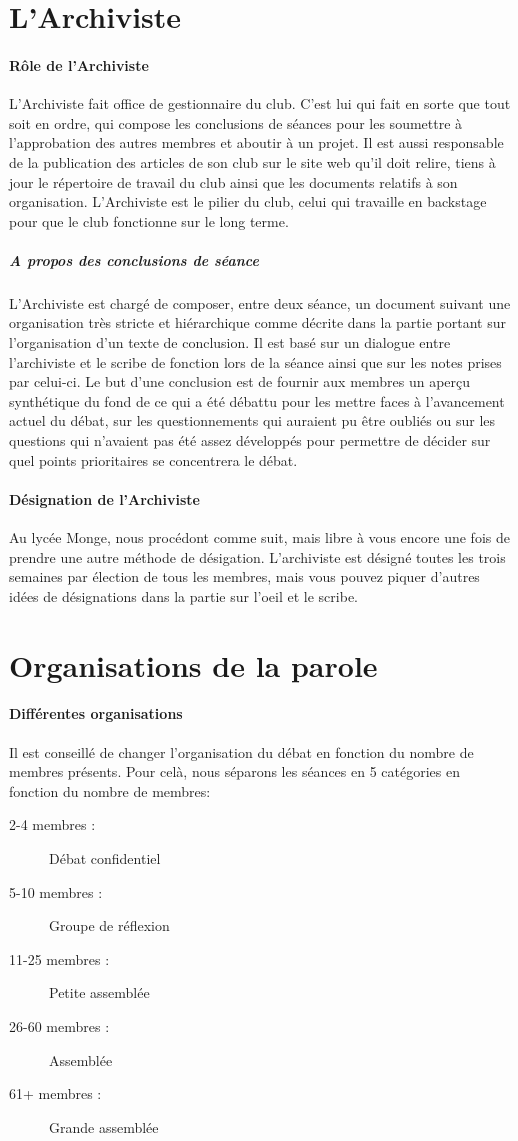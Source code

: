 \documentclass[a4paper,12pt]{article}
\begin{document}
\section{L'Archiviste}
\paragraph{Rôle de l'Archiviste}
L'Archiviste fait office de gestionnaire du club. C'est lui qui fait en sorte que tout soit en ordre, qui compose les conclusions de séances pour les soumettre à l'approbation des autres membres et aboutir à un projet. Il est aussi responsable de la publication des articles de son club sur le site web qu'il doit relire, tiens à jour le répertoire de travail du club ainsi que les documents relatifs à son organisation. L'Archiviste est le pilier du club, celui qui travaille en backstage pour que le club fonctionne sur le long terme.
\subparagraph{A propos des conclusions de séance}
L'Archiviste est chargé de composer, entre deux séance, un document suivant une organisation très stricte et hiérarchique comme décrite dans la partie portant sur l'organisation d'un texte de conclusion. Il est basé sur un dialogue entre l'archiviste et le scribe de fonction lors de la séance ainsi que sur les notes prises par celui-ci. Le but d'une conclusion est de fournir aux membres un aperçu synthétique du fond de ce qui a été débattu pour les mettre faces à l'avancement actuel du débat, sur les questionnements qui auraient pu être oubliés ou sur les questions qui n'avaient pas été assez développés pour permettre de décider sur quel points prioritaires se concentrera le débat.

\paragraph{Désignation de l'Archiviste}
Au lycée Monge, nous procédont comme suit, mais libre à vous encore une fois de prendre une autre méthode de désigation. L'archiviste est désigné toutes les trois semaines par élection de tous les membres, mais vous pouvez piquer d'autres idées de désignations dans la partie sur l'oeil et le scribe. 

\section{Organisations de la parole}
\paragraph{Différentes organisations}
Il est conseillé de changer l'organisation du débat en fonction du nombre de membres présents. Pour celà, nous séparons les séances en 5 catégories en fonction du nombre de membres:
\begin{description}
 \item[2-4 membres :] Débat confidentiel
 \item[5-10 membres :] Groupe de réflexion
 \item[11-25 membres :] Petite assemblée
 \item[26-60 membres :] Assemblée
 \item[61+ membres :] Grande assemblée
\end{description}
\end{document}

